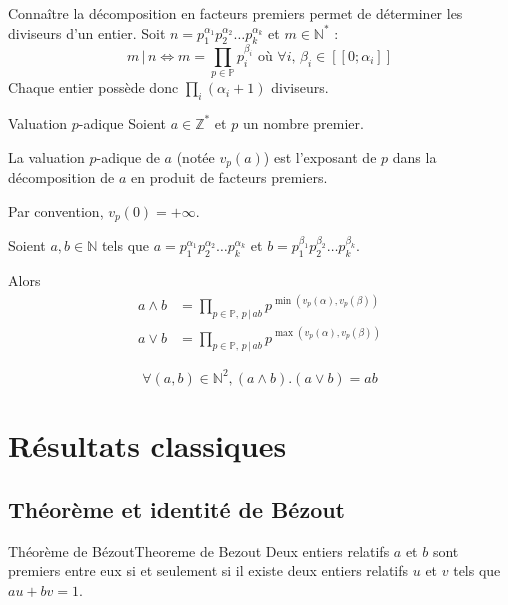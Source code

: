         Connaître la décomposition en facteurs premiers permet de déterminer les diviseurs d’un entier. Soit $n = p_{1}^{\alpha_1}p_{2}^{\alpha_2}\ldots p_{k}^{\alpha_k}$ et $m \in \mathbb{N}^{*}$ :
        \[ m \, | \, n \iff m = \prod\limits_{p \in \mathbb{P}}p_{i}^{\beta_{i}} \text{ où } \forall i, \, \beta_{i} \in  [\![0;\alpha_{i}]\!] \] 
        Chaque entier possède donc $ \prod\limits_{i}(\alpha_{i} + 1)$ diviseurs.
        
        \begin{defi}{Valuation $p$-adique}{}
            Soient $a \in \mathbb{Z}^*$ et $p$ un nombre premier.
        
            La valuation $p$-adique de $a$ (notée $v_{p}(a)$) est l'exposant de $p$ dans la décomposition de $a$ en produit de facteurs premiers. 

            Par convention, $v_{p}(0) = + \infty$.
        \end{defi}
        
        \begin{prop}{}{}
            Soient $a,b \in \mathbb{N}$ tels que $a = p_{1}^{\alpha_1}p_{2}^{\alpha_2}\ldots p_{k}^{\alpha_k}$ et \newline $b = p_{1}^{\beta_1}p_{2}^{\beta_2}\ldots p_{k}^{\beta_k}$.
        
            Alors \begin{align*}
                a \land b &= \prod\limits_{p \in \mathbb{P},\, p \, | \, ab} p^{\min(v_{p}(\alpha),v_{p}(\beta))} \\
                a \lor b &= \prod\limits_{p \in \mathbb{P},\, p \, | \, ab} p^{\max(v_{p}(\alpha), v_{p}(\beta))}
            \end{align*}
        \end{prop}
        
        \begin{coro}{}{}
        \[ \forall (a,b) \in \mathbb{N}^{2}, (a \wedge b).(a \vee b) = ab \]
        \end{coro}

\section{Résultats classiques}

\subsection{Théorème et identité de Bézout}

    \begin{theo}{Théorème de Bézout}{Theoreme de Bezout}
        Deux entiers relatifs $a$ et $b$ sont premiers entre eux si et seulement si il existe deux entiers relatifs $u$ et $v$ tels que $au + bv = 1$.
    \end{theo}

